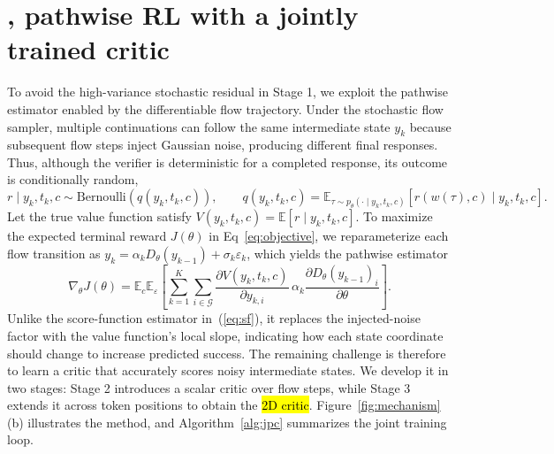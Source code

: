 \section{\jpc{}, pathwise RL with a jointly trained critic}
\label{sec:method}
To avoid the high-variance stochastic residual in Stage 1, we exploit the pathwise estimator enabled by the differentiable flow trajectory. Under the stochastic flow sampler, multiple continuations can follow the same intermediate state $y_k$ because subsequent flow steps inject Gaussian noise, producing different final responses. Thus, although the verifier is deterministic for a completed response, its outcome is conditionally random,
\[
r\mid y_k,t_k,c\sim\mathrm{Bernoulli}\!\left(q(y_k,t_k,c)\right),
\qquad
q(y_k,t_k,c)=\mathbb E_{\tau\sim p_\theta(\cdot\mid y_k,t_k,c)}[r(w(\tau),c)\mid y_k,t_k,c].
\]
Let the true value function satisfy $V(y_k,t_k,c)=\mathbb E[r\mid y_k,t_k,c]$. To maximize the expected terminal reward $J(\theta)$ in Eq~\ref{eq:objective}, we reparameterize each flow transition as $y_k=\alpha_kD_\theta(y_{k-1})+\sigma_k\varepsilon_k$, which yields the pathwise estimator
\begin{equation}
\nabla_\theta J(\theta)
=
\mathbb E_c\mathbb E_{\varepsilon}
\left[
\sum_{k=1}^{K}
\sum_{i\in\mathcal G}
\frac{\partial V(y_k,t_k,c)}{\partial y_{k,i}}\,
\alpha_k
\frac{\partial D_\theta(y_{k-1})_i}{\partial\theta}
\right].
\label{eq:pw}
\end{equation}
Unlike the score-function estimator in~(\ref{eq:sf}), it replaces the injected-noise factor with the value function's local slope, indicating how each state coordinate should change to increase predicted success. The remaining challenge is therefore to learn a critic that accurately scores noisy intermediate states. We develop it in two stages: Stage 2 introduces a scalar critic over flow steps, while Stage 3 extends it across token positions to obtain the \hl{2D critic}. Figure~\ref{fig:mechanism}(b) illustrates the method, and Algorithm~\ref{alg:jpc} summarizes the joint training loop.

